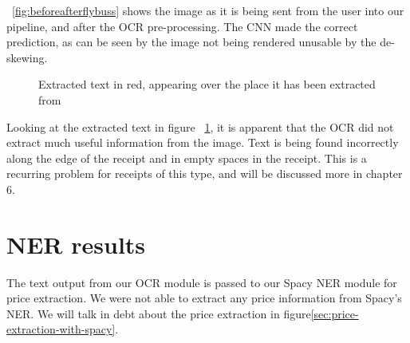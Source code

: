 \clearpage

\figurename{~\ref{fig:beforeafterflybuss}} shows the image as it is being sent from the user into our pipeline, and
after the OCR pre-processing.
The CNN made the correct prediction, as can be seen by the image not being rendered unusable by the de-skewing.


\begin{figure}[h]
    \caption{Extracted text in red, appearing over the place it has been extracted from}
    \label{fig:resultflybuss}
\end{figure}

Looking at the extracted text in figure \figurename{~\ref{fig:resultflybuss}}, it is apparent that the OCR did not
extract much useful information from the image.
Text is being found incorrectly along the edge of the receipt and in empty spaces in the receipt.
This is a recurring problem for receipts of this type, and will be discussed more in chapter 6.

\section{NER results}\label{sec:ner-results}
The text output from our OCR module is passed to our Spacy NER module for price extraction.
We were not able to extract any price information from Spacy's NER\@.
We will talk in debt about the price extraction in figure\ref{sec:price-extraction-with-spacy}.





